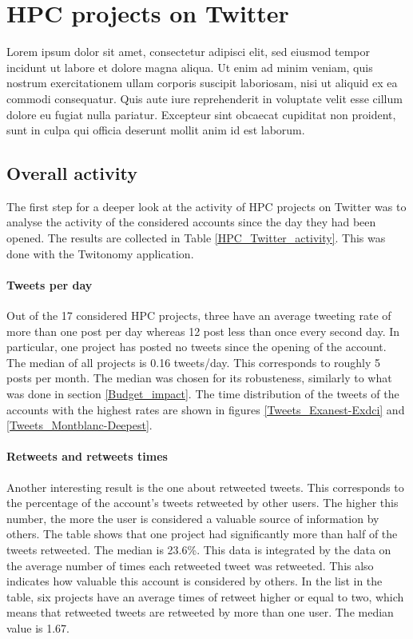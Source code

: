 \chapter{HPC projects on Twitter} \label{HPC_projects_on_Twitter}
Lorem ipsum dolor sit amet, consectetur adipisci elit, sed eiusmod tempor incidunt ut labore et dolore magna aliqua. Ut enim ad minim veniam, quis nostrum exercitationem ullam corporis suscipit laboriosam, nisi ut aliquid ex ea commodi consequatur. Quis aute iure reprehenderit in voluptate velit esse cillum dolore eu fugiat nulla pariatur. Excepteur sint obcaecat cupiditat non proident, sunt in culpa qui officia deserunt mollit anim id est laborum.

\section{Overall activity}
The first step for a deeper look at the activity of HPC projects on Twitter was to analyse the activity of the considered accounts since the day they had been opened. The results are collected in Table \ref{HPC_Twitter_activity}. This was done with the Twitonomy application.

\subsubsection{Tweets per day}
Out of the 17 considered HPC projects, three have an average tweeting rate of more than one post per day whereas 12 post less than once every second day. In particular, one project has posted no tweets since the opening of the account. The median of all projects is 0.16 tweets/day. This corresponds to roughly 5 posts per month. The median was chosen for its robusteness, similarly to what was done in section \ref{Budget_impact}. The time distribution of the tweets of the accounts with the highest rates are shown in figures \ref{Tweets_Exanest-Exdci} and \ref{Tweets_Montblanc-Deepest}.  

\subsubsection{Retweets and retweets times}
Another interesting result is the one about retweeted tweets. This corresponds to the percentage of the account's tweets retweeted by other users. The higher this number, the more the user is considered a valuable source of information by others. The table shows that one project had significantly more than half of the tweets retweeted. The median is 23.6\%. This data is integrated by the data on the average number of times each retweeted tweet was retweeted. This also indicates how valuable this account is considered by others. In the list in the table, six projects have an average times of retweet higher or equal to two, which means that retweeted tweets are retweeted by more than one user. The median value is 1.67.

